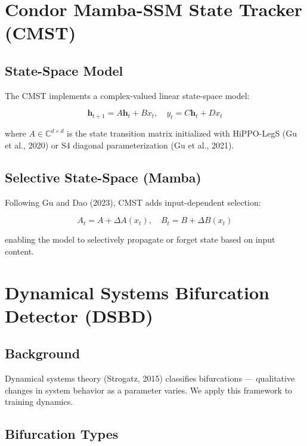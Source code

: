 \documentclass[11pt]{article}
\theoremstyle{plain}
\begin{document}
\section{Condor Mamba-SSM State Tracker (CMST)}

\subsection{State-Space Model}

The CMST implements a complex-valued linear state-space model:

\begin{equation}
\mathbf{h}_{t+1} = A \mathbf{h}_t + B x_t, \quad y_t = C \mathbf{h}_t + D x_t
\end{equation}

where \( A \in \mathbb{C}^{d \times d} \) is the state transition matrix initialized with HiPPO-LegS (Gu et al., 2020) or S4 diagonal parameterization (Gu et al., 2021).

\subsection{Selective State-Space (Mamba)}

Following Gu and Dao (2023), CMST adds input-dependent selection:

\begin{equation}
A_t = A + \Delta A(x_t), \quad B_t = B + \Delta B(x_t)
\end{equation}

enabling the model to selectively propagate or forget state based on input content.


\section{Dynamical Systems Bifurcation Detector (DSBD)}

\subsection{Background}

Dynamical systems theory (Strogatz, 2015) classifies bifurcations — qualitative changes in system behavior as a parameter varies. We apply this framework to training dynamics.

\subsection{Bifurcation Types}
\end{document}
